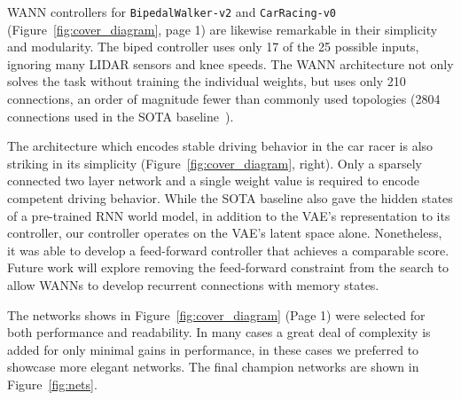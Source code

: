 WANN controllers for \texttt{BipedalWalker-v2} and \texttt{CarRacing-v0} (Figure~\ref{fig:cover_diagram}, page 1) are likewise remarkable in their simplicity and modularity. 
%
The biped controller uses only 17 of the 25 possible inputs, ignoring many LIDAR sensors and knee speeds.
%
The WANN architecture not only solves the task without training the individual weights, but uses only 210 connections, an order of magnitude fewer than commonly used topologies (2804 connections used in the SOTA baseline~\cite{ha2018designrl}). 

The architecture which encodes stable driving behavior in the car racer is also striking in its simplicity (Figure~\ref{fig:cover_diagram}, right). 
%
Only a sparsely connected two layer network and a single weight value is required to encode competent driving behavior.
%
While the SOTA baseline \cite{ha2018worldmodels} also gave the hidden states of a pre-trained RNN world model, in addition to the VAE's representation to its controller, our controller operates on the VAE's latent space alone. Nonetheless, it was able to develop a feed-forward controller that achieves a comparable score. Future work will explore removing the feed-forward constraint from the search to allow WANNs to develop recurrent connections with memory states.

The networks shows in Figure~\ref{fig:cover_diagram}  (Page 1) were selected for both performance and readability. In many cases a great deal of complexity is added for only minimal gains in performance, in these cases we preferred to showcase more elegant networks. The final champion networks are shown in Figure~\ref{fig:nets}.


